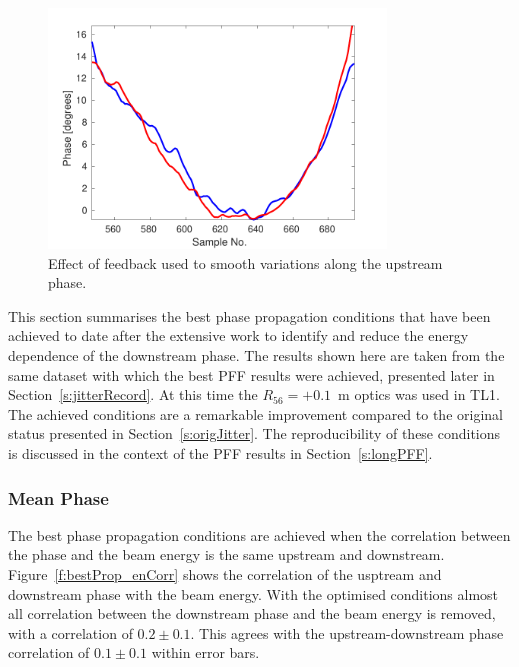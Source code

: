 \begin{figure}
  \centering
  \includegraphics[width=0.8\textwidth]{Figures/propagation/beforeAfterDavideFlatten}
  \caption{Effect of feedback used to smooth variations along the upstream phase.}
  \label{f:beforeAfterDavideFlatten}
\end{figure}



This section summarises the best phase propagation conditions that have been achieved to date after the extensive work to identify and reduce the energy dependence of the downstream phase. The results shown here are taken from the same dataset with which the best PFF results were achieved, presented later in Section~\ref{s:jitterRecord}. At this time the \(R_{56} = +0.1\)~m optics was used in TL1. The achieved conditions are a remarkable improvement compared to the original status presented in Section~\ref{s:origJitter}. The reproducibility of these conditions is discussed in the context of the PFF results in Section~\ref{s:longPFF}.

\subsubsection{Mean Phase}

The best phase propagation conditions are achieved when the correlation between the phase and the beam energy is the same upstream and downstream. Figure~\ref{f:bestProp_enCorr} shows the correlation of the usptream and downstream phase with the beam energy. With the optimised conditions almost all correlation between the downstream phase and the beam energy is removed, with a correlation of \(0.2\pm0.1\). This agrees with the upstream-downstream phase correlation of \(0.1\pm0.1\) within error bars.


